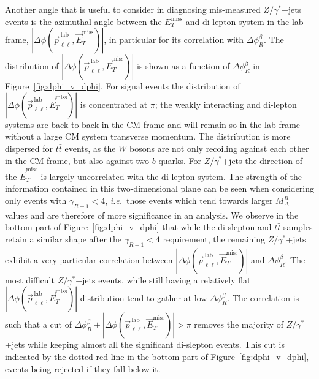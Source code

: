 Another angle that is useful to consider in diagnosing mis-measured $Z/\gamma^{*}$+jets events is the azimuthal angle between the $E_{T}^\text{miss}$ and di-lepton system in the lab frame, $|\Delta\phi (\vec{p}_{\ell\ell}^{\, \text{lab}},\vec{E}_{T}^\text{miss})|$, in particular for its correlation with $\Delta \phi_{R}^{\beta}$. The distribution of $|\Delta\phi (\vec{p}_{\ell\ell}^{\, \text{lab}},\vec{E}_{T}^\text{miss})|$ is shown as a function of $\Delta \phi_{R}^{\beta}$ in Figure~\ref{fig:dphi_v_dphi}. For signal events the distribution of $|\Delta\phi (\vec{p}_{\ell\ell}^{\, \text{lab}},\vec{E}_{T}^\text{miss})|$ is concentrated at $\pi$; the weakly interacting and di-lepton systems are back-to-back in the CM frame and will remain so in the lab frame without a large CM system transverse momentum. The distribution is more dispersed for $t\bar{t}$ events, as the $W$ bosons are not only recoiling against each other in the CM frame, but also against two $b$-quarks. For $Z/\gamma^{*}$+jets the direction of the $\vec{E}_{T}^\text{miss}$ is largely uncorrelated with the di-lepton system. The strength of the information contained in this two-dimensional plane can be seen when considering only events with $\gamma_{R+1} < 4$, {\it i.e.}~those events which tend towards larger $M_{\Delta}^{R}$ values and are therefore of more significance in an analysis. We observe in the bottom part of Figure~\ref{fig:dphi_v_dphi} that while the di-slepton and $t\bar{t}$ samples retain a similar shape after the $\gamma_{R+1} < 4$ requirement, the remaining $Z/\gamma^{*}$+jets exhibit a very particular correlation between $|\Delta\phi (\vec{p}_{\ell\ell}^{\, \text{lab}},\vec{E}_{T}^\text{miss})|$ and $\Delta\phi_{R}^{\beta}$. The most difficult $Z/\gamma^{*}$+jets events, while still having a relatively flat $|\Delta\phi (\vec{p}_{\ell\ell}^{\, \text{lab}},\vec{E}_{T}^\text{miss})|$ distribution tend to gather at low $\Delta \phi_{R}^{\beta}$. The correlation is such that a cut of $\Delta\phi_{R}^{\beta} + |\Delta\phi (\vec{p}_{\ell\ell}^{\, \text{lab}},\vec{E}_{T}^\text{miss})| > \pi$ removes the majority of $Z/\gamma^{*}$+jets while keeping almost all the significant di-slepton events. This cut is indicated by the dotted red line in the bottom part of Figure~\ref{fig:dphi_v_dphi}, events being rejected if they fall below it.

